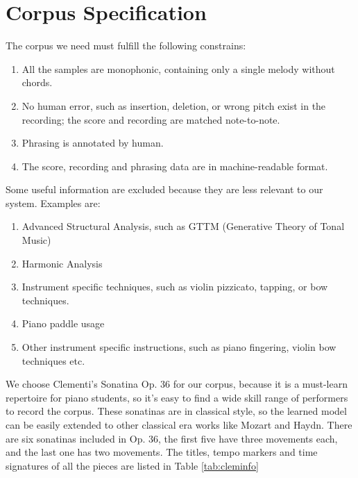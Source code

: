 \section{Corpus Specification}

The corpus we need must fulfill the following constrains:
\begin{enumerate}
   \item All the samples are monophonic, containing only a single melody without chords.
   \item No human error, such as insertion, deletion, or wrong pitch exist in the recording; the score and recording are matched note-to-note.
   \item Phrasing is annotated by human. 
   \item The score, recording and phrasing data are in machine-readable format.

\end{enumerate}

Some useful information are excluded because they are less relevant to our system. Examples are:

\begin{enumerate}
   \item Advanced Structural Analysis, such as GTTM (Generative Theory of Tonal Music)\cite{GTTM}
   \item Harmonic Analysis
   \item Instrument specific techniques, such as violin pizzicato, tapping, or bow techniques.
   \item Piano paddle usage
   \item Other instrument specific instructions, such as piano fingering, violin bow techniques etc.
\end{enumerate}

We choose Clementi's Sonatina Op. 36 for our corpus, because it is a must-learn repertoire for piano students, so it's easy to find a wide skill range of performers to record the corpus. These sonatinas are in classical style, so the learned model can be easily extended to other classical era works like Mozart and Haydn. There are six sonatinas included in Op. 36, the first five have three movements each, and the last one has two movements. The titles, tempo markers and time signatures of all the pieces are listed in Table \ref{tab:cleminfo}


